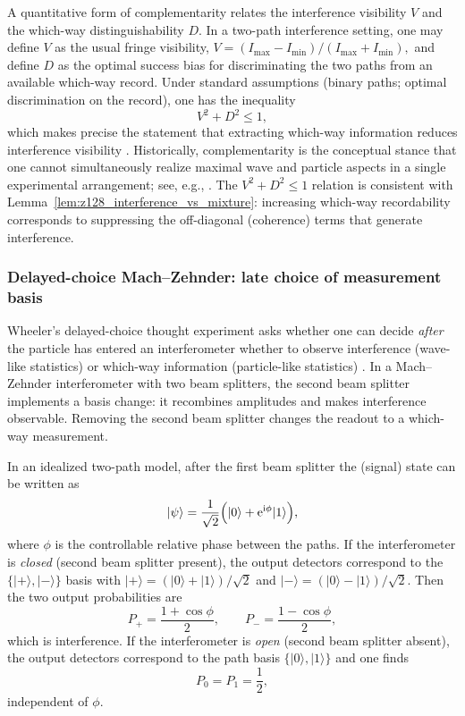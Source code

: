 A quantitative form of complementarity relates
the interference visibility $V$ and the which-way distinguishability $D$.
In a two-path interference setting, one may define $V$ as the usual fringe visibility,
$
V=(I_{\max}-I_{\min})/(I_{\max}+I_{\min}),
$
and define $D$ as the optimal success bias for discriminating the two paths from an available which-way record.
Under standard assumptions (binary paths; optimal discrimination on the record),
one has the inequality
$$
V^2+D^2\le 1,
$$
which makes precise the statement that extracting which-way information reduces interference visibility \cite{Englert1996FringeVisibility}.
Historically, complementarity is the conceptual stance that one cannot simultaneously realize maximal wave and particle aspects in a single experimental arrangement; see, e.g., \cite{Bohr1928QuantumPostulate}.
The $V^2+D^2\le 1$ relation is consistent with Lemma~\ref{lem:z128_interference_vs_mixture}: increasing which-way recordability corresponds to suppressing the off-diagonal (coherence) terms that generate interference.

\subsubsection{Delayed-choice Mach--Zehnder: late choice of measurement basis}
\label{subsec:delayed_choice_mzi}

Wheeler's delayed-choice thought experiment asks whether one can decide \emph{after} the particle has entered an interferometer
whether to observe interference (wave-like statistics) or which-way information (particle-like statistics) \cite{Wheeler1978DelayedChoice}.
In a Mach--Zehnder interferometer with two beam splitters, the second beam splitter implements a basis change: it recombines amplitudes and makes interference observable.
Removing the second beam splitter changes the readout to a which-way measurement.

In an idealized two-path model, after the first beam splitter the (signal) state can be written as
$$
|\psi\rangle=\frac{1}{\sqrt{2}}\Bigl(|0\rangle+\mathrm{e}^{\mathrm{i}\phi}|1\rangle\Bigr),
$$
where $\phi$ is the controllable relative phase between the paths.
If the interferometer is \emph{closed} (second beam splitter present), the output detectors correspond to the $\{|+\rangle,|-\rangle\}$ basis with
$
|+\rangle=(|0\rangle+|1\rangle)/\sqrt{2}
$
and
$
|-\rangle=(|0\rangle-|1\rangle)/\sqrt{2}.
$
Then the two output probabilities are
$$
P_+=\frac{1+\cos\phi}{2},\qquad P_-=\frac{1-\cos\phi}{2},
$$
which is interference.
If the interferometer is \emph{open} (second beam splitter absent), the output detectors correspond to the path basis $\{|0\rangle,|1\rangle\}$ and one finds
$$
P_0=P_1=\frac{1}{2},
$$
independent of $\phi$.

